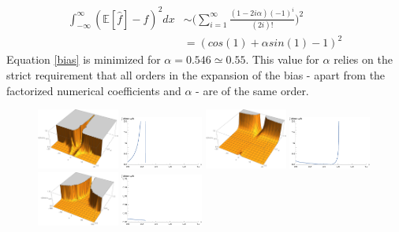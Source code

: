 \documentclass[
twoside,
openright,
titlepage,
numbers=noenddot,
headinclude,%
footinclude=true,
dottedtoc, %
ngerman,
american, %
pagesize=pdftex,
]{book}
\begin{document}
	\begin{equation}
		\begin{split}
			\int_{-\infty}^{\infty}(\mathbb{E}[\hat{f}]-f)^2dx&\sim \bigg(\sum_{i=1}^{\infty}\frac{(1-2i\alpha)(-1)^i}{(2i)!}\bigg)^2\\
			&=(cos(1)+\alpha sin(1)-1)^2
		\end{split}
		\label{bias}
	\end{equation}
	Equation \eqref{bias} is minimized for $\alpha=0.546\simeq 0.55$. This value for $\alpha$ relies on the strict requirement that all orders in the expansion of the bias - apart from the factorized numerical coefficients and $\alpha$ - are of the same order. 
	\begin{example}
		\begin{figure}[H]
			\centering
			\captionsetup{width=0.95\textwidth}
			\includegraphics[width=0.24\textwidth]{figures/norm1}
			\includegraphics[width=0.24\textwidth]{figures/norm2}
			\includegraphics[width=0.24\textwidth]{figures/student1}
			\includegraphics[width=0.24\textwidth]{figures/student2}
			\includegraphics[width=0.24\textwidth]{figures/log1}
			\includegraphics[width=0.24\textwidth]{figures/log2}

\end{figure}
\end{example}
\end{document}
